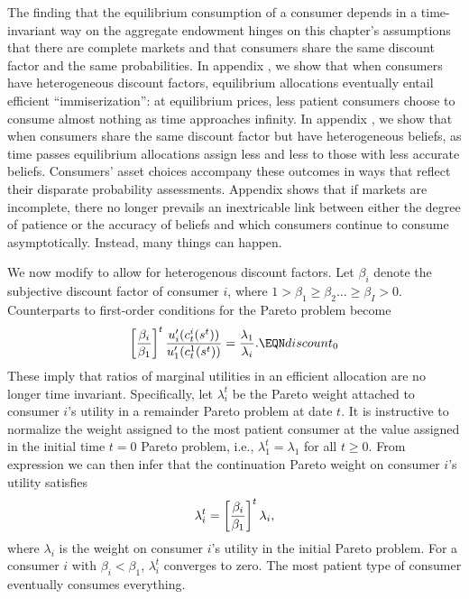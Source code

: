 \noindent
The  finding that the equilibrium consumption of a consumer
depends in a time-invariant way on the aggregate endowment hinges
 on this chapter's assumptions that there are  complete markets and  that
consumers  share the same  discount factor and the same probabilities.
In appendix , we show that when consumers have heterogeneous
discount factors,  equilibrium allocations eventually entail  efficient
 ``immiserization'': at equilibrium prices,  less patient
consumers choose to consume almost nothing
as time approaches infinity.
In appendix , we show that when consumers share the same discount factor but have  heterogeneous beliefs,  as  time passes  equilibrium allocations assign   less
and less  to those
with less accurate beliefs.
Consumers' asset choices accompany these outcomes in ways that reflect their disparate probability assessments.
Appendix  shows that if markets are incomplete, there no longer prevails an inextricable
link between  either the degree of patience or the
accuracy of beliefs and  which consumers continue to consume  asymptotically. Instead, many things can happen.




We now modify  to allow for heterogenous discount
factors.  Let $\beta_i$ denote
the subjective discount factor of consumer $i$, where
$1 > \beta_1\geq \beta_2 \ldots \geq \beta_I > 0$.
Counterparts to first-order conditions  for the
Pareto problem become
$$ \left[ \beta_i \over \beta_1 \right]^t
{u_i^\prime(c^i_t(s^t)) \over u_1^\prime(c^1_t(s^t))}
                   = {\lambda_1  \over \lambda_i}.  \EQN discount_0 $$
These imply that ratios of marginal utilities in an efficient allocation are no longer time invariant.
 Specifically, let $\lambda^t_i$ be the
Pareto weight attached to consumer $i$'s utility in a
remainder Pareto problem at date $t$. It is instructive to
normalize  the weight assigned to the
most patient consumer at the value assigned in the initial time $t=0$
Pareto problem, i.e., $\lambda^t_1 = \lambda_1$ for all $t\geq0$.
From expression  we can then infer that the continuation
Pareto weight on consumer $i$'s utility satisfies
$$
\lambda^t_i =  \left[ \beta_i \over \beta_1 \right]^t \lambda_i,
$$
where $\lambda_i$ is the weight on consumer $i$'s utility in the
initial Pareto problem.
For a consumer $i$ with  $\beta_i < \beta_1$, $\lambda^t_i$ converges to
zero.  The most patient type of consumer eventually
consumes everything.


